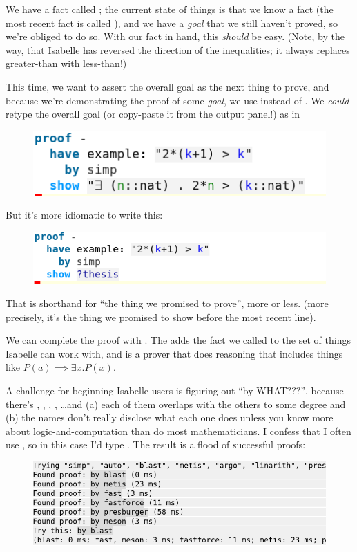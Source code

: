 We have a fact called ; the current state of things is that we know a fact (the most recent fact is called ), and we have a \textit{goal} that we still haven't proved, so we're obliged to do so. With our fact in hand, this \textit{should} be easy. (Note, by the way, that Isabelle has reversed the direction of the inequalities; it always replaces greater-than with less-than!)

This time, we want to assert the overall goal as the next thing to prove, and because we're demonstrating the proof of some \textit{goal}, we use  instead of . We \textit{could} retype the overall goal (or copy-paste it from the output panel!) as in 
\begin{figure}[h]
    \includegraphics[width=0.5\linewidth]{TEXT/C01/Images/bad-show.png}
\end{figure}

But it's more idiomatic to write this:
\begin{figure}[H]
    \includegraphics[width=0.75\linewidth]{TEXT/C01/Images/good-show.png}
\end{figure}

That  is shorthand for ``the thing we promised to prove'', more or less. (more precisely, it's the thing we promised to show before the most recent  line). 

We can complete the proof with . The  adds the fact we called  to the set of things Isabelle can work with, and  is a prover that does reasoning that includes things like $P(a) \implies \exists x . P(x)$.

A challenge for beginning Isabelle-users is figuring out ``by WHAT???'', because there's , , , , \ldots  and (a) each of them overlaps with the others to some degree and (b) the names don't really disclose what each one does unless you know more about logic-and-computation than do most mathematicians. I confess that I often use , so in this case I'd type . The result is a flood of successful proofs:
\begin{figure}[h]
    \includegraphics[width=0.75\linewidth]{TEXT/C01/Images/flood.png}
\end{figure}

